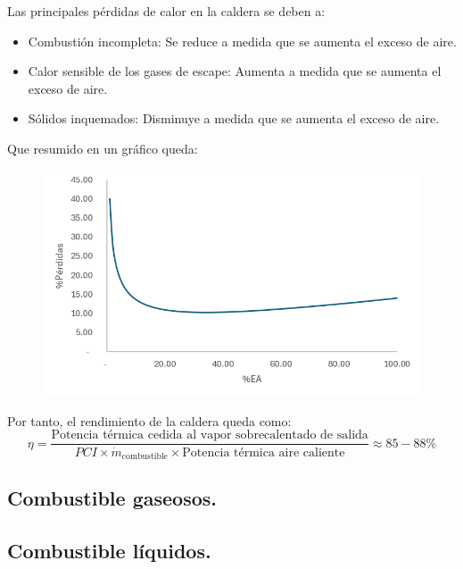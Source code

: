 \begin{enumerate}
\begin{itemize}
				
				Las principales pérdidas de calor en la caldera se deben a:
				\begin{itemize}
					\item Combustión incompleta: Se reduce a medida que se aumenta el exceso de aire.
					\item Calor sensible de los gases de escape: Aumenta a medida que se aumenta el exceso de aire.
					\item Sólidos inquemados: Disminuye a medida que se aumenta el exceso de aire.
				\end{itemize}
				Que resumido en un gráfico queda:
				\begin{figure}[H]
					\centering
					\includegraphics[width=0.6\linewidth]{res/tema2/perdidas}
					\label{fig:perdidas}
				\end{figure}
				Por tanto, el rendimiento de la caldera queda como:
				\[\eta = \frac{\text{Potencia térmica cedida al vapor sobrecalentado de salida}}{PCI \times \dot{m}_\text{combustible} \times \text{Potencia térmica aire caliente}}\approx 85-88\%\]
		\end{itemize}
\end{enumerate}
\subsection{Combustible gaseosos.}
\subsection{Combustible líquidos.}